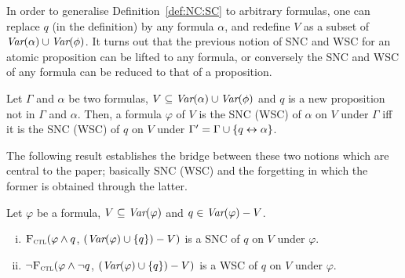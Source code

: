 \documentclass{article}
\begin{document}
In order to generalise Definition~\ref{def:NC:SC} to arbitrary formulas, one can replace $q$ (in the definition)  by any formula $\alpha$, and redefine  $V$ as a subset of $\textit{Var}(\alpha) \cup \textit{Var}(\phi)$.
    It turns out that the previous notion of SNC and WSC for an atomic proposition can be lifted to any formula, or conversely the SNC and WSC of any formula can be reduced to that of a proposition.
\begin{proposition}\label{formulaNS_to_p}
     Let $\Gamma$ and $\alpha$ be two formulas, $V \subseteq \textit{Var}(\alpha) \cup \textit{Var}(\phi)$  and $q$ is a new proposition not in $\Gamma$ and $\alpha$.
 Then, a formula $\varphi$ of $V$ is the SNC (WSC) of $\alpha$ on $V$ under  $\Gamma$ iff it is the SNC (WSC) of $q$ on $V$ under $\Gamma' = \Gamma \cup \{q \leftrightarrow \alpha\}$.   
 \end{proposition}

The following result establishes the bridge between these two notions which are central to the paper; basically  SNC (WSC)  and the forgetting in which the former is obtained through the latter.




\begin{theorem}\label{thm:SNC:WSC:forget}
 Let $\varphi$ be a formula, $V\subseteq\textit{Var}(\varphi)$ and $q\in\textit{Var}(\varphi)- V$.
 \begin{enumerate}[(i)]
   \item ${\textsc{F}_{\textsc{ctl}}} (\varphi \land q$, $(\textit{Var}(\varphi) \cup \{q\}) - V)$
   is a SNC of $q$ on $V$ under $\varphi$.
   \item  $\neg{\textsc{F}_{\textsc{ctl}}} (\varphi \land \neg q$, $(\textit{Var}(\varphi) \cup \{q\}) - V)$
   is a WSC of $q$ on $V$ under $\varphi$.
 \end{enumerate}
 \end{theorem}
\end{document}
